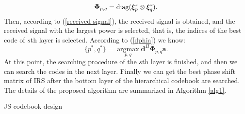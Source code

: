 \documentclass[12pt,draftclsnofoot,onecolumn]{IEEEtran}
\begin{document}
	\begin{equation}\label{JSPhi}
		{\bm \Phi}_{p,q}={\rm diag}({\bm \xi}^s_p \otimes {\bm \xi}^s_q).
	\end{equation}
	Then, according to (\ref{received signal}), the received signal is obtained, and the received signal with the largest power is selected, that is, the indices  of the  best code of $s$th layer  is selected. According to (\ref{dphia}) we know:
	\begin{equation}\label{JSbest}
		\{p^*,q^*\}=\mathop{\arg\max}\limits_{p,q}{\bm d}^H {\bm \Phi}_{p,q}{\bm a} .
	\end{equation}
	At this point, the searching procedure of the $s$th layer is finished, and then we can search the codes in the next layer. Finally we can get the best phase shift matrix of IRS after the bottom  layer of the hierarchical codebook are searched. The details of the proposed algorithm are summarized in Algorithm  \ref{alg1}.
	
	
	\makeatletter
	\newcommand{\removelatexerror}{\let\@latex@error\@gobble}
	\makeatother
	\renewcommand{\algorithmicrequire}{\textbf{Input:}}
	\renewcommand{\algorithmicensure}{\textbf{Output:}}
	\removelatexerror
	\begin{algorithm}
		
		\caption{JS codebook design}
		\begin{algorithmic}[1]\label{alg1}
			\REPEAT{}
			
			
		\end{algorithmic}
	\end{algorithm}
	\vspace{-0in}%
	
	
\end{document}
